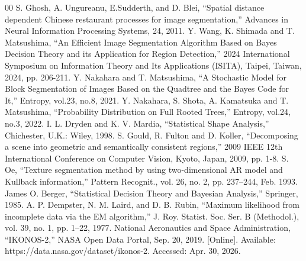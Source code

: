 \documentclass[conference]{IEEEtran}
\theoremstyle{definition}
\begin{document}
\begin{thebibliography}{00}
   S. Ghosh, A. Ungureanu, E.Sudderth, and D. Blei, ``Spatial distance dependent Chinese restaurant processes for image segmentation,'' Advances in Neural Information Processing Systems, 24, 2011.
   Y. Wang, K. Shimada and T. Matsushima, ``An Efficient Image Segmentation Algorithm Based on Bayes Decision Theory and its Application for Region Detection,'' 2024 International Symposium on Information Theory and Its Applications (ISITA), Taipei, Taiwan, 2024, pp. 206-211.
   Y. Nakahara and T. Matsushima, ``A Stochastic Model for Block Segmentation of Images Based on the Quadtree and the Bayes Code for It,'' Entropy, vol.23, no.8, 2021.
   Y. Nakahara, S. Shota, A. Kamatsuka and T. Matsushima, ``Probability Distribution on Full Rooted Trees,'' Entropy, vol.24, no.3, 2022.
   I. L. Dryden and K. V. Mardia, ``Statistical Shape Analysis,'' Chichester, U.K.: Wiley, 1998.
   S. Gould, R. Fulton and D. Koller, ``Decomposing a scene into geometric and semantically consistent regions,'' 2009 IEEE 12th International Conference on Computer Vision, Kyoto, Japan, 2009, pp. 1-8.
   S. Oe, ``Texture segmentation method by using two-dimensional AR model and Kullback information,'' Pattern Recognit., vol. 26, no. 2, pp. 237–244, Feb. 1993.
   James O. Berger, ``Statistical Decision Theory and Bayesian Analysis,” Springer, 1985.
   A. P. Dempster, N. M. Laird, and D. B. Rubin, ``Maximum likelihood from incomplete data via the EM algorithm,'' J. Roy. Statist. Soc. Ser. B (Methodol.), vol. 39, no. 1, pp. 1–22, 1977.
   National Aeronautics and Space Administration, ``IKONOS-2,'' NASA Open Data Portal, Sep. 20, 2019. [Online]. Available: https://data.nasa.gov/dataset/ikonos-2. Accessed: Apr. 30, 2026.
  \end{thebibliography}
\end{document}
